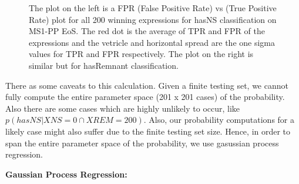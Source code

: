 \begin{figure}[htp]
  \centering
  \quad
  \caption{The plot on the left is a FPR (False Positive Rate) vs (True Positive Rate) plot for all 200 winning expressions for hasNS classification on MS1-PP EoS. The red dot is the average of TPR and FPR of the expressions and the vetricle and horizontal spread are the one sigma values for TPR and FPR respectively. The plot on the right is similar but for hasRemnant classification.  }
  \label{fig:FPR_TPR}
\end{figure}

There as some caveats to this calculation. Given a finite testing set, we cannot fully compute the entire parameter space (201 x 201 cases) of the probability. Also there are some cases which are highly unlikely to occur, like $p(hasNS | XNS=0 \cap XREM=200)$. Also, our probability computations for a likely case might also suffer due to the finite testing set size. Hence, in order to span the entire parameter space of the probability, we use gasussian process regression.

\textbf{Gaussian Process Regression:}



